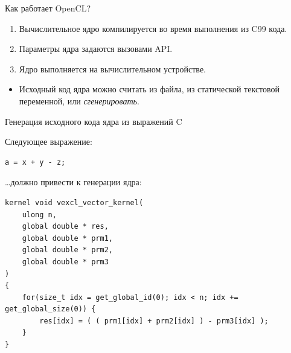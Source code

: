 \documentclass[@BEAMER_OPTIONS@]{beamer}
\newcommand{\CXX}{{\rm C}\plusplus}
\newcommand{\CC}{{\rm C99}\xspace}
\begin{document}
\note{ }

\begin{frame}{Как работает OpenCL?}
    \begin{enumerate}
        \item Вычислительное ядро компилируется во время выполнения из \CC
            кода.
        \item Параметры ядра задаются вызовами API.
        \item Ядро выполняется на вычислительном устройстве.
    \end{enumerate}
    \vspace{\baselineskip}
    \pause
    \begin{itemize}
        \item Исходный код ядра можно считать из файла, из статической
            текстовой переменной, или \alert{\emph{сгенерировать}}.
    \end{itemize}
\end{frame}

\note{ }

\begin{frame}[fragile]{Генерация исходного кода ядра из выражений \CXX}
    \begin{exampleblock}{Следующее выражение:}
        \begin{lstlisting}
a = x + y - z;
        \end{lstlisting}
    \end{exampleblock}
    \begin{exampleblock}{\ldots должно привести к генерации ядра:}
        \begin{lstlisting}
kernel void vexcl_vector_kernel(
    ulong n,
    global double * res,
    global double * prm1,
    global double * prm2,
    global double * prm3
)
{
    for(size_t idx = get_global_id(0); idx < n; idx += get_global_size(0)) {
        res[idx] = ( ( prm1[idx] + prm2[idx] ) - prm3[idx] );
    }
}
        \end{lstlisting}
    \end{exampleblock}
\end{frame}
\end{document}
